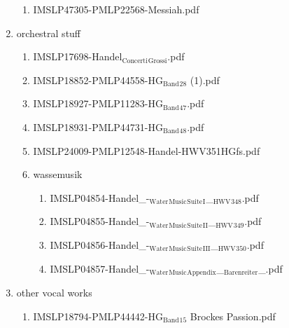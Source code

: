 \documentclass[11pt]{article}
\begin{document}
\begin{enumerate}
\begin{enumerate}
\item IMSLP47305-PMLP22568-Messiah.pdf
\label{sec-1-1-1-1-44-37-2-26}
\end{enumerate}

\item orchestral stuff
\label{sec-1-1-1-1-44-37-3}
\begin{enumerate}
\item IMSLP17698-Handel$_{\text{Concerti}}$$_{\text{Grossi}}$.pdf
\label{sec-1-1-1-1-44-37-3-1}

\item IMSLP18852-PMLP44558-HG$_{\text{Band}}$$_{\text{28}}$ (1).pdf
\label{sec-1-1-1-1-44-37-3-2}

\item IMSLP18927-PMLP11283-HG$_{\text{Band}}$$_{\text{47}}$.pdf
\label{sec-1-1-1-1-44-37-3-3}

\item IMSLP18931-PMLP44731-HG$_{\text{Band}}$$_{\text{48}}$.pdf
\label{sec-1-1-1-1-44-37-3-4}

\item IMSLP24009-PMLP12548-Handel-HWV351HGfs.pdf
\label{sec-1-1-1-1-44-37-3-5}

\item wassemusik
\label{sec-1-1-1-1-44-37-3-6}
\begin{enumerate}
\item IMSLP04854-Handel\_-$_{\text{Water}}$$_{\text{Music}}$$_{\text{Suite}}$$_{\text{I}}$\_$_{\text{HWV}}$$_{\text{348}}$.pdf
\label{sec-1-1-1-1-44-37-3-6-1}

\item IMSLP04855-Handel\_-$_{\text{Water}}$$_{\text{Music}}$$_{\text{Suite}}$$_{\text{II}}$\_$_{\text{HWV}}$$_{\text{349}}$.pdf
\label{sec-1-1-1-1-44-37-3-6-2}

\item IMSLP04856-Handel\_-$_{\text{Water}}$$_{\text{Music}}$$_{\text{Suite}}$$_{\text{III}}$\_$_{\text{HWV}}$$_{\text{350}}$.pdf
\label{sec-1-1-1-1-44-37-3-6-3}

\item IMSLP04857-Handel\_-$_{\text{Water}}$$_{\text{Music}}$$_{\text{Appendix}}$\_$_{\text{Barenreiter}}$\_.pdf
\label{sec-1-1-1-1-44-37-3-6-4}
\end{enumerate}
\end{enumerate}

\item other vocal works
\label{sec-1-1-1-1-44-37-4}
\begin{enumerate}
\item IMSLP18794-PMLP44442-HG$_{\text{Band}}$$_{\text{15}}$ Brockes Passion.pdf
\label{sec-1-1-1-1-44-37-4-1}


\end{enumerate}
\end{enumerate}
\end{document}
